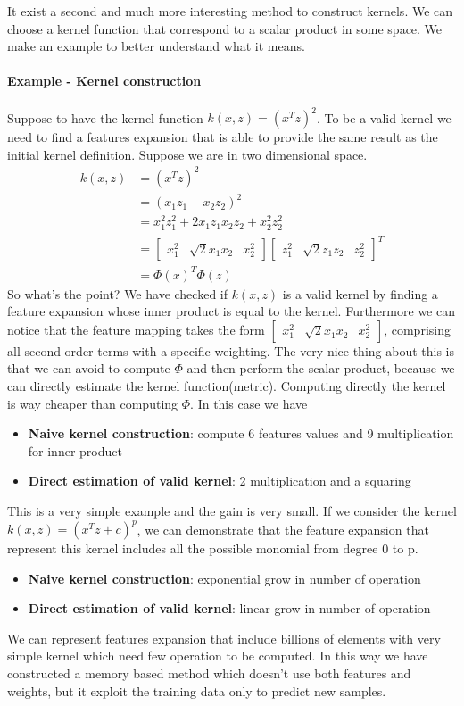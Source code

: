 \documentclass[main.tex]{subfiles}
\begin{document}
It exist a second and much more interesting method to construct kernels. We can choose a kernel function that correspond to a scalar product in some space. We make an example to better understand what it means.
\paragraph{Example - Kernel construction}Suppose to have the kernel function $k(x, z) = (x^T z)^2$.
To be a valid kernel we need to find a features expansion that is able to provide the same result as the initial kernel definition. Suppose we are in two dimensional space.
\begin{align*}
    k(x,z) &= (x^T z)^2 \\
    &= (x_1z_1 + x_2z_2)^2 \\
    &= x_1^2z_1^2 + 2x_1z_1x_2z_2 + x_2^2z_2^2 \\
    &= \begin{bmatrix} x_1^2 & \sqrt{2}x_1x_2 & x_2^2\end{bmatrix}\begin{bmatrix} z_1^2 & \sqrt{2}z_1z_2 & z_2^2\end{bmatrix}^T \\
    &= \Phi(x)^T \Phi(z)
\end{align*}
So what's the point? We have checked if $k(x,z)$ is a valid kernel by finding a feature expansion whose inner product is equal to the kernel. Furthermore we can notice that the feature mapping takes the form $\begin{bmatrix} x_1^2 & \sqrt{2}x_1x_2 & x_2^2\end{bmatrix}$, comprising all second order terms with a specific weighting. The very nice thing about this is that we can avoid to compute $\Phi$ and then perform the scalar product, because we can directly estimate the kernel function(metric). Computing directly the kernel is way cheaper than computing $\Phi$.
In this case we have
\begin{itemize}
    \item \textbf{Naive kernel construction}: compute 6 features values and 9 multiplication for inner product
    \item \textbf{Direct estimation of valid kernel}: 2 multiplication and a squaring
\end{itemize}
This is a very simple example and the gain is very small. If we consider the kernel $k(x,z) = (x^T z + c)^p$, we can demonstrate that the feature expansion that represent this kernel includes all the possible monomial from degree 0 to p.
\begin{itemize}
    \item \textbf{Naive kernel construction}: exponential grow in number of operation
    \item \textbf{Direct estimation of valid kernel}: linear grow in number of operation
\end{itemize}
We can represent features expansion that include billions of elements with very simple kernel which need few operation to be computed.
In this way we have constructed a memory based method which doesn't use both features and weights, but it exploit the training data only to predict new samples.
\end{document}
